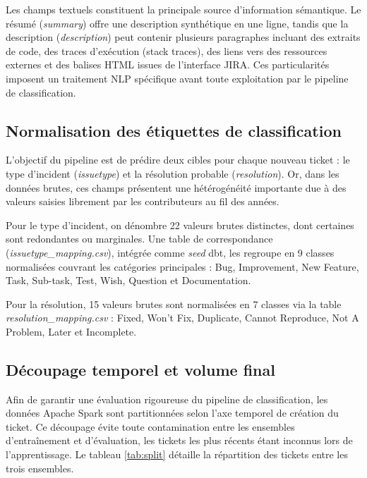 Les champs textuels constituent la principale source d'information sémantique. Le résumé (\textit{summary}) offre une description synthétique en une ligne, tandis que la description (\textit{description}) peut contenir plusieurs paragraphes incluant des extraits de code, des traces d'exécution (stack traces), des liens vers des ressources externes et des balises HTML issues de l'interface JIRA. Ces particularités imposent un traitement NLP spécifique avant toute exploitation par le pipeline de classification.

\subsection{Normalisation des étiquettes de classification}

L'objectif du pipeline est de prédire deux cibles pour chaque nouveau ticket : le type d'incident (\textit{issuetype}) et la résolution probable (\textit{resolution}). Or, dans les données brutes, ces champs présentent une hétérogénéité importante due à des valeurs saisies librement par les contributeurs au fil des années.

Pour le type d'incident, on dénombre 22 valeurs brutes distinctes, dont certaines sont redondantes ou marginales. Une table de correspondance (\textit{issuetype\_mapping.csv}), intégrée comme \textit{seed} dbt, les regroupe en 9 classes normalisées couvrant les catégories principales : Bug, Improvement, New Feature, Task, Sub-task, Test, Wish, Question et Documentation.

Pour la résolution, 15 valeurs brutes sont normalisées en 7 classes via la table \textit{resolution\_mapping.csv} : Fixed, Won't Fix, Duplicate, Cannot Reproduce, Not A Problem, Later et Incomplete.

\subsection{Découpage temporel et volume final}

Afin de garantir une évaluation rigoureuse du pipeline de classification, les données Apache Spark sont partitionnées selon l'axe temporel de création du ticket. Ce découpage évite toute contamination entre les ensembles d'entraînement et d'évaluation, les tickets les plus récents étant inconnus lors de l'apprentissage. Le tableau \ref{tab:split} détaille la répartition des tickets entre les trois ensembles.

